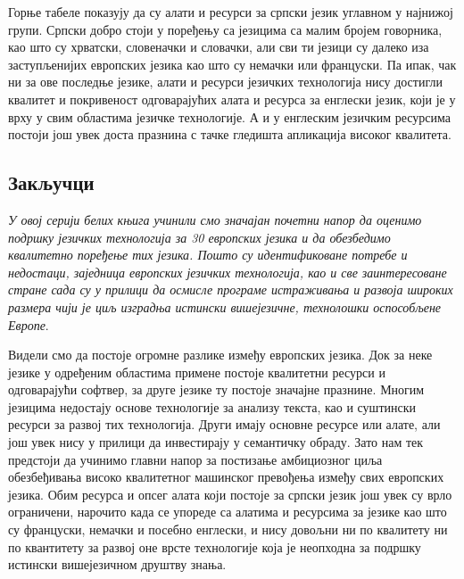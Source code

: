 {\begin{multicols}{2}
Горње табеле показују да су алати и ресурси за српски језик углавном у најнижој групи. Српски добро стоји у поређењу са језицима са малим бројем говорника, као што су хрватски, словеначки и словачки, али сви ти језици су далеко иза заступљенијих европских језика као што су немачки или француски. Па ипак, чак ни за ове последње језике, алати и ресурси  језичких технологија нису достигли квалитет и покривеност одговарајућих алата и ресурса за енглески језик, који је у врху у свим областима језичке технологије. А и у енглеским језичким ресурсима постоји још увек доста празнина с тачке гледишта апликација високог квалитета.



 \subsection {Закључци}
   
\textit{У овој серији белих књига учинили смо значајан почетни напор да оценимо подршку језичких технологија за 30 европских језика и да обезбедимо квалитетно поређење тих језика. Пошто су идентификоване потребе и недостаци, заједница европских језичких технологија, као и све заинтересоване стране сада су у прилици да осмисле програме истраживања и развоја широких размера чији је циљ изградња истински вишејезичне,  технолошки оспособљене Европе}.

Видели смо да постоје огромне разлике између европских језика. Док за неке језике у одређеним областима примене постоје квалитетни ресурси и  одговарајући софтвер, за друге језике ту постоје значајне празнине. Многим језицима недостају основе технологије за анализу текста, као и суштински ресурси за развој тих технологија. Други имају основне ресурсе или алате, али још увек нису у прилици да инвестирају у семантичку обраду. Зато нам тек предстоји да учинимо главни напор за постизање амбициозног циља обезбеђивања високо квалитетног машинског превођења између свих европских језика.  
Обим ресурса и опсег алата који постоје за српски језик још увек су врло ограничени, нарочито када се упореде са алатима и ресурсима за језике као што су француски, немачки и посебно енглески, и нису довољни ни по квалитету ни по квантитету за развој оне врсте технологије која је неопходна за подршку истински вишејезичном друштву знања. 


\end{multicols}}
